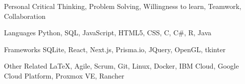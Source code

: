 

\begin{cvskills}

  \cvskill
    {Personal} %
    {Critical Thinking, Problem Solving, Willingness to learn, Teamwork, Collaboration} %

  \cvskill
    {Languages} %
    {Python, SQL, JavaScript, HTML5, CSS, C, C\#, R, Java} %

  \cvskill
    {Frameworks} %
    {SQLite, React, Next.js, Prisma.io, JQuery, OpenGL, tkinter} %

  \cvskill
    {Other Related} %
    {LaTeX, Agile, Scrum, Git, Linux, Docker, IBM Cloud, Google Cloud Platform, Proxmox VE, Rancher} %


\end{cvskills}
